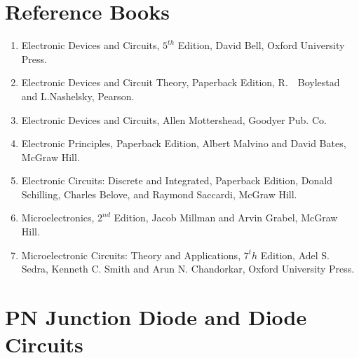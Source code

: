 \documentclass[a4aper,12pt]{report}
\begin{document}
\chapter*{Reference Books}
\vspace*{-2.7cm}
\thispagestyle{empty}
\begin{enumerate}
    \item Electronic Devices and Circuits, $5^{th}$ Edition, David Bell, Oxford University Press.
    \item Electronic Devices and Circuit Theory, Paperback Edition,  R.  \,\, Boylestad and L.Nashelsky, Pearson.
    \item Electronic Devices and Circuits, Allen Mottershead, Goodyer Pub. Co.
    \item Electronic Principles, Paperback Edition, Albert Malvino and David Bates, McGraw Hill.
    \item Electronic Circuits: Discrete and Integrated, Paperback Edition, Donald Schilling, Charles Belove, and Raymond Saccardi, McGraw Hill.
    \item Microelectronics, $2^{nd}$ Edition, Jacob Millman and Arvin Grabel, McGraw Hill.
    \item Microelectronic Circuits: Theory and Applications, $7^th$ Edition, Adel S. Sedra, Kenneth C. Smith and Arun N. Chandorkar, Oxford University Press.
\end{enumerate}
\tableofcontents 
\thispagestyle{empty}
\newpage
\setcounter{page}{1}
\chapter{PN Junction Diode and Diode Circuits}
\vspace*{-20pt}
\end{document}
